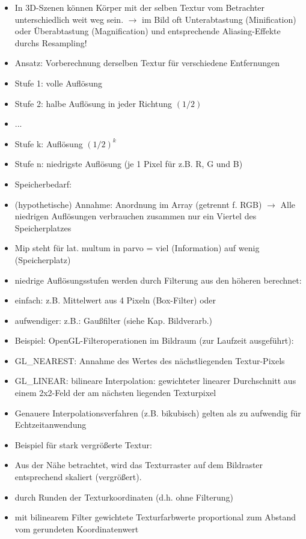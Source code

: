 \documentclass[10pt,landscape]{article}
\begin{document}
\begin{multicols}{3}
{\begin{itemize}
  
  \item In 3D-Szenen können Körper mit der selben Textur vom Betrachter unterschiedlich weit weg sein. $\rightarrow$ im Bild oft Unterabtastung (Minification) oder Überabtastung (Magnification) und entsprechende Aliasing-Effekte durchs Resampling!
  \item Ansatz: Vorberechnung derselben Textur für verschiedene Entfernungen
  \item Stufe 1: volle Auflösung
  \item Stufe 2: halbe Auflösung in jeder Richtung $(1/2)$
  \item ...
  \item Stufe k: Auflösung $(1/2)^k$
  \item Stufe n: niedrigste Auflösung (je 1 Pixel für z.B. R, G und B)
  \item Speicherbedarf:
  \item (hypothetische) Annahme: Anordnung im Array (getrennt f. RGB) $\rightarrow$ Alle niedrigen Auflösungen verbrauchen zusammen nur ein Viertel des Speicherplatzes
  \item Mip steht für lat. multum in parvo = viel (Information) auf wenig (Speicherplatz)
  \item niedrige Auflösungsstufen werden durch Filterung aus den höheren berechnet:
  \item einfach: z.B. Mittelwert aus 4 Pixeln (Box-Filter) oder
  \item aufwendiger: z.B.: Gaußfilter (siehe Kap. Bildverarb.)
  
  \item Beispiel: OpenGL-Filteroperationen im Bildraum (zur Laufzeit ausgeführt):
  \item GL\_NEAREST: Annahme des Wertes des nächstliegenden Textur-Pixels
  \item GL\_LINEAR: bilineare Interpolation: gewichteter linearer Durchschnitt aus einem 2x2-Feld der am nächsten liegenden Texturpixel
  \item Genauere Interpolationsverfahren (z.B. bikubisch) gelten als zu aufwendig für Echtzeitanwendung
  \item Beispiel für stark vergrößerte Textur:
  \item Aus der Nähe betrachtet, wird das Texturraster auf dem Bildraster entsprechend skaliert (vergrößert).
  \item durch Runden der Texturkoordinaten (d.h. ohne Filterung)
  \item mit bilinearem Filter gewichtete Texturfarbwerte proportional zum Abstand vom gerundeten Koordinatenwert
  

\end{itemize}}
\end{multicols}
\end{document}

